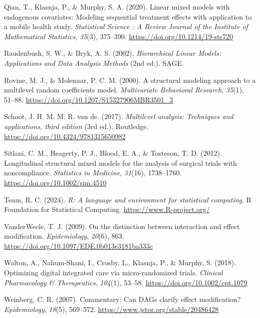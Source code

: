 \documentclass[
  11pt,
  a4paper,
]{article}
\newlength{\cslhangindent}
\newenvironment{CSLReferences}[2] %
 {\begin{list}{}{%
  \setlength{\itemindent}{0pt}
  \setlength{\leftmargin}{0pt}
  \setlength{\parsep}{0pt}
  \ifodd #1
   \setlength{\leftmargin}{\cslhangindent}
   \setlength{\itemindent}{-1\cslhangindent}
  \fi
  \setlength{\itemsep}{#2\baselineskip}}}
 {\end{list}}
\begin{document}
\begin{CSLReferences}{1}{0}
Qian, T., Klasnja, P., \& Murphy, S. A. (2020). Linear mixed models with
endogenous covariates: Modeling sequential treatment effects with
application to a mobile health study. \emph{Statistical Science : A
Review Journal of the Institute of Mathematical Statistics},
\emph{35}(3), 375--390. \url{https://doi.org/10.1214/19-sts720}

Raudenbush, S. W., \& Bryk, A. S. (2002). \emph{Hierarchical Linear
Models: Applications and Data Analysis Methods} (2nd ed.). SAGE.

Rovine, M. J., \& Molenaar, P. C. M. (2000). A structural modeling
approach to a multilevel random coefficients model. \emph{Multivariate
Behavioral Research}, \emph{35}(1), 51--88.
\url{https://doi.org/10.1207/S15327906MBR3501_3}

Schoot, J. H. M. M. R. van de. (2017). \emph{Multilevel analysis:
Techniques and applications, third edition} (3rd ed.). Routledge.
\url{https://doi.org/10.4324/9781315650982}

Sitlani, C. M., Heagerty, P. J., Blood, E. A., \& Tosteson, T. D.
(2012). Longitudinal structural mixed models for the analysis of
surgical trials with noncompliance. \emph{Statistics in Medicine},
\emph{31}(16), 1738--1760. \url{https://doi.org/10.1002/sim.4510}

Team, R. C. (2024). \emph{R: A language and environment for statistical
computing}. R Foundation for Statistical Computing.
\url{https://www.R-project.org/}

VanderWeele, T. J. (2009). On the distinction between interaction and
effect modification. \emph{Epidemiology}, \emph{20}(6), 863.
\url{https://doi.org/10.1097/EDE.0b013e3181ba333c}

Walton, A., Nahum-Shani, I., Crosby, L., Klasnja, P., \& Murphy, S.
(2018). Optimizing digital integrated care via micro-randomized trials.
\emph{Clinical Pharmacology \& Therapeutics}, \emph{104}(1), 53--58.
\url{https://doi.org/10.1002/cpt.1079}

Weinberg, C. R. (2007). Commentary: Can DAGs clarify effect
modification? \emph{Epidemiology}, \emph{18}(5), 569--572.
\url{https://www.jstor.org/stable/20486428}


\end{CSLReferences}
\end{document}

